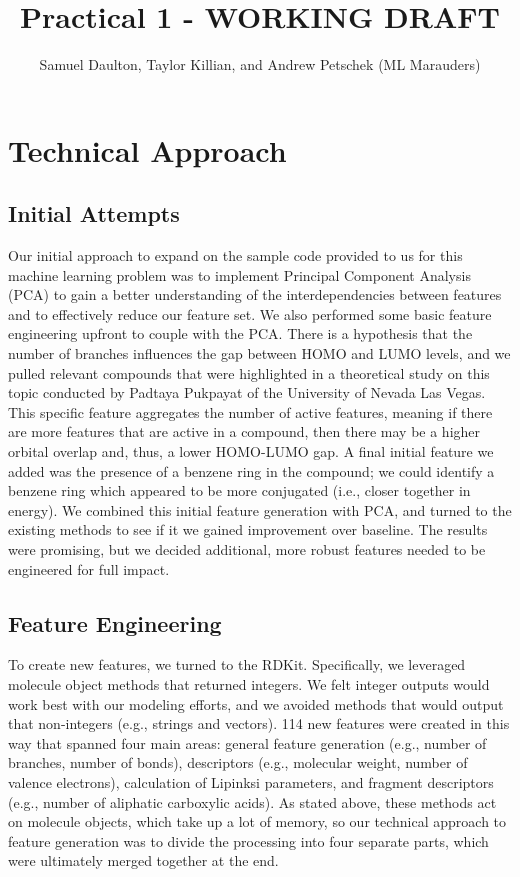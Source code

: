 \documentclass[11pt, oneside]{article}   	%
\title{Practical 1 - WORKING DRAFT}
\author{Samuel Daulton, Taylor Killian, and Andrew Petschek (ML Marauders)}
\begin{document}
\maketitle
\section{Technical Approach}
\subsection{Initial Attempts} 


Our initial approach to expand on the sample code provided to us for this machine learning problem was to implement Principal Component Analysis (PCA) to gain a better understanding of the interdependencies between features and to effectively reduce our feature set. We also performed some basic feature engineering upfront to couple with the PCA. There is a hypothesis that the number of branches influences the gap between HOMO and LUMO levels, and we pulled relevant compounds that were highlighted in a theoretical study on this topic conducted by Padtaya Pukpayat of the University of Nevada Las Vegas. This specific feature aggregates the number of active features, meaning if there are more features that are active in a compound, then there may be a higher orbital overlap and, thus, a lower HOMO-LUMO gap. A final initial feature we added was the presence of a benzene ring in the compound; we could identify a benzene ring which appeared to be more conjugated (i.e., closer together in energy). We combined this initial feature generation with PCA, and turned to the existing methods to see if it we gained improvement over baseline. The results were promising, but we decided additional, more robust features needed to be engineered for full impact. 

\subsection{Feature Engineering} 

To create new features, we turned to the RDKit. Specifically, we leveraged molecule object methods that returned integers. We felt integer outputs would work best with our modeling efforts, and we avoided methods that would output that non-integers (e.g., strings and vectors). 114 new features were created in this way that spanned four main areas: general feature generation (e.g., number of branches, number of bonds), descriptors (e.g., molecular weight, number of valence electrons), calculation of Lipinksi parameters, and fragment descriptors (e.g., number of aliphatic carboxylic acids). As stated above, these methods act on molecule objects, which take up a lot of memory, so our technical approach to feature generation was to divide the processing into four separate parts, which were ultimately merged together at the end. 
\end{document}
